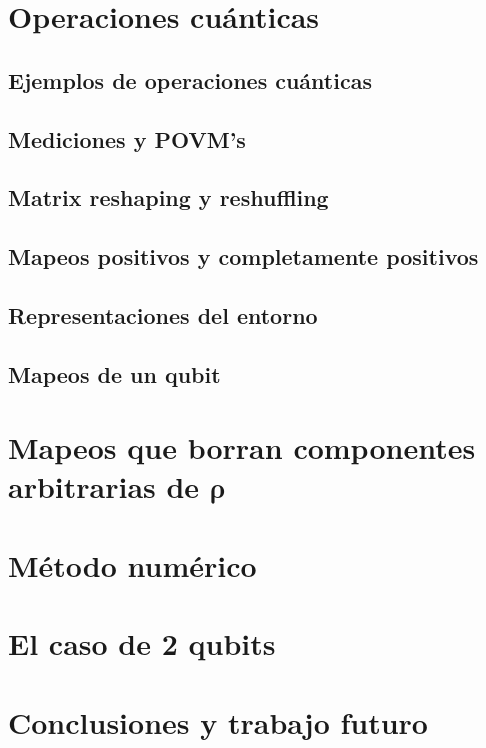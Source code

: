 \documentclass[12pt]{report}
\begin{document}
\chapter{Operaciones cuánticas}

\section{Ejemplos de operaciones cuánticas}

\section{Mediciones y POVM's}

\section{Matrix reshaping y reshuffling}

\section{Mapeos positivos y completamente positivos}

\section{Representaciones del entorno}

\section{Mapeos de un qubit}



\chapter{Mapeos que borran componentes arbitrarias de $\boldsymbol{\rho}$}



\chapter{Método numérico}


\chapter{El caso de 2 qubits}

\chapter{Conclusiones y trabajo futuro}





\end{document}
